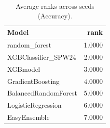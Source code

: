 \begin{table}[t]
\centering
\begin{tabular}{lr}
\toprule
Model & rank \\
\midrule
random_forest & 1.0000 \\
XGBClassifier_SPW24 & 2.0000 \\
XGBmodel & 3.0000 \\
GradientBoosting & 4.0000 \\
BalancedRandomForest & 5.0000 \\
LogisticRegression & 6.0000 \\
EasyEnsemble & 7.0000 \\
\bottomrule
\end{tabular}
\caption{Average ranks across seeds (Accuracy).}
\label{tab:avg_rank_Accuracy}
\end{table}
